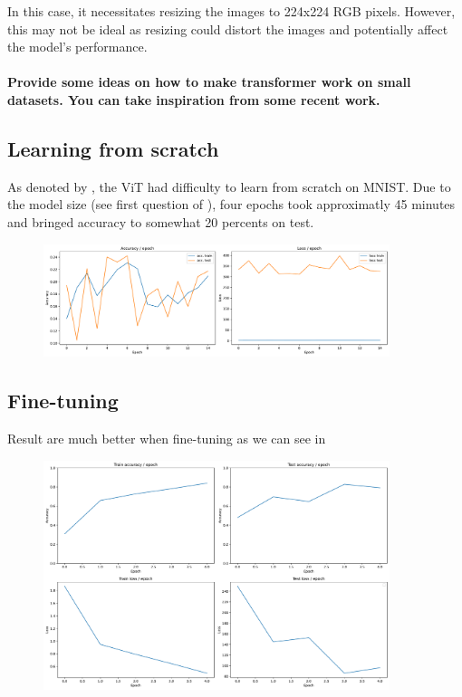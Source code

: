 In this case, it necessitates resizing the images to 224x224 RGB pixels. However, this may not be ideal as resizing could distort the images and potentially affect the model's performance.

\paragraph{Provide some ideas on how to make transformer work on small datasets. You can take inspiration from some recent work.}


\subsection{Learning from scratch}
As denoted by , the ViT had difficulty to learn from scratch on MNIST. Due to the model size (see first question of ), four epochs took approximatly 45 minutes and bringed accuracy to somewhat 20 percents on test.

\begin{figure}[H]
    \centering
    \includegraphics*[width=0.9\textwidth]{figs/Transformers/stats_vit.pdf}
    \caption{}
    \label{fig:stats_vit}
\end{figure}


\subsection{Fine-tuning}
Result are much better when fine-tuning as we can see in 
\begin{figure}[H]
    \centering
    \includegraphics*[width=0.9\textwidth]{figs/Transformers/stats_vit_pretrained.pdf}
    \caption{}
    \label{fig:stats_vit_pretrained}
\end{figure}


